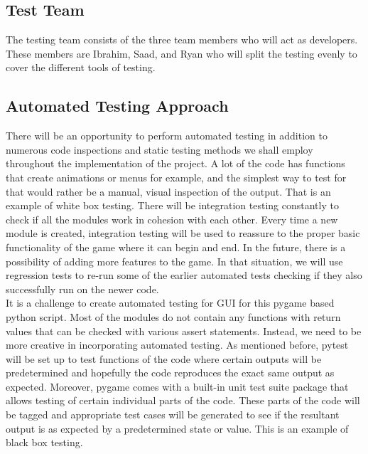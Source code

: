 \documentclass[12pt, titlepage]{article}
\begin{document}
\subsection{Test Team}
The testing team consists of the three team members who will act as developers. These members are Ibrahim, Saad, and Ryan who will split the testing evenly to cover the different tools of testing.

\subsection{Automated Testing Approach}
There will be an opportunity to perform automated testing in addition to numerous code inspections and static testing methods we shall employ throughout the implementation of the project. A lot of the code has functions that create animations or menus for example, and the simplest way to test for that would rather be a manual, visual inspection of the output. That is an example of white box testing. There will be integration testing constantly to check if all the modules work in cohesion with each other. Every time a new module is created, integration testing will be used to reassure to the proper basic functionality of the game where it can begin and end.  In the future, there is a possibility of adding more features to the game. In that situation, we will use regression tests to re-run some of the earlier automated tests checking if they also successfully run on the newer code. 
\newline
\\It is a challenge to create automated testing for GUI for this pygame based python script. Most of the modules do not contain any functions with return values that can be checked with various assert statements. Instead, we need to be more creative in incorporating automated testing. As mentioned before, pytest will be set up to test functions of the code where certain outputs will be predetermined and hopefully the code reproduces the exact same output as expected. Moreover, pygame comes with a built-in unit test suite package that allows testing of certain individual parts of the code. These parts of the code will be tagged and appropriate test cases will be generated to see if the resultant output is as expected by a predetermined state or value. This is an example of black box testing. 
\end{document}

